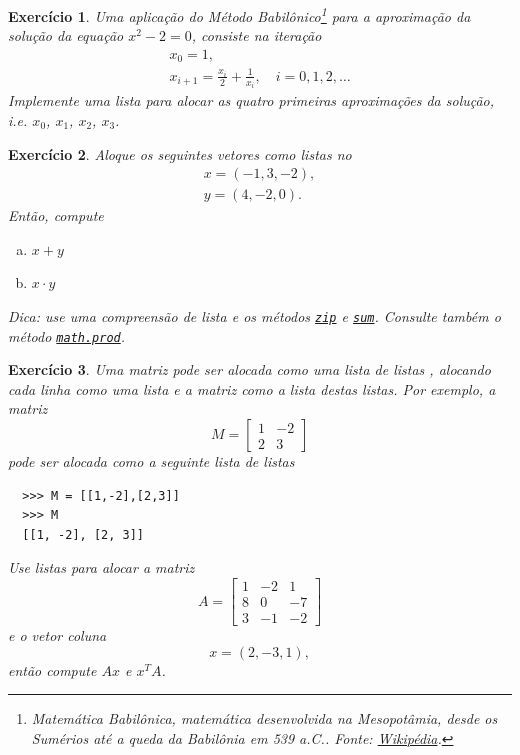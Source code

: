 \documentclass[12pt]{article}
\newtheorem{exr}{Exercício}[section]
\begin{document}
\begin{exr}
  Uma aplicação do Método Babilônico\footnote{Matemática Babilônica, matemática desenvolvida na Mesopotâmia, desde os Sumérios até a queda da Babilônia em 539 a.C.. Fonte: \href{https://pt.wikipedia.org/wiki/Matem\%C3\%A1tica\_babil\%C3\%B4nica}{Wikipédia}.} para a aproximação da solução da equação $x^2-2 = 0$, consiste na iteração
  \begin{gather}
    x_0 = 1,\\
    x_{i+1} = \frac{x_i}{2} + \frac{1}{x_i},\quad i=0,1,2,\ldots
  \end{gather}
  Implemente uma lista para alocar as quatro primeiras aproximações da solução, i.e. $x_0$, $x_1$, $x_2$, $x_3$.
\end{exr}

\begin{exr}
  Aloque os seguintes vetores como listas no {\python}
  \begin{gather}
    x = (-1, 3, -2),\\
    y = (4, -2, 0).
  \end{gather}
  Então, compute
  \begin{enumerate}[a)]
  \item $x+y$
  \item $x\cdot y$
  \end{enumerate}
  Dica: use uma compreensão de lista e os métodos {\python} \href{https://docs.python.org/3/library/functions.html#zip}{\lstinline+zip+} e \href{https://docs.python.org/3/library/functions.html?highlight=sum#sum}{\lstinline+sum+}. Consulte também o método \href{https://docs.python.org/3/library/math.html?highlight=prod#math.prod}{\lstinline+math.prod+}.
\end{exr}

\begin{exr}
  Uma matriz pode ser alocada como uma lista de listas {\python}, alocando cada linha como uma lista e a matriz como a lista destas listas. Por exemplo, a matriz
  \begin{equation}
    M =
    \begin{bmatrix}
      1 & -2 \\
      2 & 3
    \end{bmatrix}
  \end{equation}
  pode ser alocada como a seguinte lista de listas
  \begin{lstlisting}
  >>> M = [[1,-2],[2,3]]
  >>> M
  [[1, -2], [2, 3]]
  \end{lstlisting}
  Use listas para alocar a matriz
  \begin{equation}
    A =
    \begin{bmatrix}
      1 & -2 & 1\\
      8 & 0 & -7\\
      3 & -1 & -2
    \end{bmatrix}
  \end{equation}
  e o vetor coluna
  \begin{equation}
    x = (2, -3, 1),
  \end{equation}
  então compute $Ax$ e $x^TA$.
\end{exr}
\end{document}
